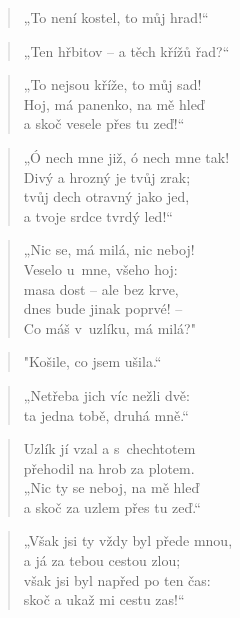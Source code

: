 \begin{verse}
„To není kostel, to můj hrad!“
\end{verse}

\begin{verse}
„Ten hřbitov -- a těch křížů řad?“
\end{verse}

\begin{verse}
„To nejsou kříže, to můj sad! \\
Hoj, má panenko, na mě hleď \\
a skoč vesele přes tu zeď!“
\end{verse}

\begin{verse}
„Ó nech mne již, ó nech mne tak! \\
Divý a hrozný je tvůj zrak; \\
tvůj dech otravný jako jed, \\
a tvoje srdce tvrdý led!“
\end{verse}

\begin{verse}
„Nic se, má milá, nic neboj! \\
Veselo u~mne, všeho hoj: \\
masa dost -- ale bez krve, \\
dnes bude jinak poprvé! -- \\
Co máš v~uzlíku, má milá?"
\end{verse}

\begin{verse}
"Košile, co jsem ušila.“
\end{verse}

\begin{verse}
„Netřeba jich víc nežli dvě: \\
ta jedna tobě, druhá mně.“
\end{verse}

\begin{verse}
Uzlík jí vzal a s~chechtotem \\
přehodil na hrob za plotem. \\
„Nic ty se neboj, na mě hleď \\
a skoč za uzlem přes tu zeď.“
\end{verse}

\begin{verse}
„Však jsi ty vždy byl přede mnou, \\
a já za tebou cestou zlou; \\
však jsi byl napřed po ten čas: \\
skoč a ukaž mi cestu zas!“
\end{verse}

